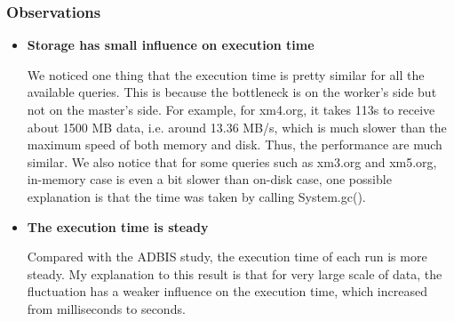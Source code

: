 \subsubsection{Observations}

\begin{itemize}
\item \textbf{Storage has small influence on execution time}
 
We noticed one thing that the execution time is pretty similar for
all the available queries. This is because the bottleneck is on the
worker's side but not on the master's side. For example, for xm4.org,
it takes 113s to receive about 1500 MB data, i.e. around 13.36 MB/s, 
which is much slower than the maximum speed of both memory and disk. 
Thus, the performance are much similar. We also notice that for some
queries such as xm3.org and xm5.org, in-memory case is even a bit 
slower than on-disk case, one possible explanation is that the time 
was taken by calling System.gc(). 


\item \textbf{The execution time is steady}

Compared with the ADBIS study, the execution time of each run is more
steady. My explanation to this result is that for very large scale
of data, the fluctuation has a weaker influence on the execution
time, which increased from milliseconds to seconds. 


\end{itemize}


 